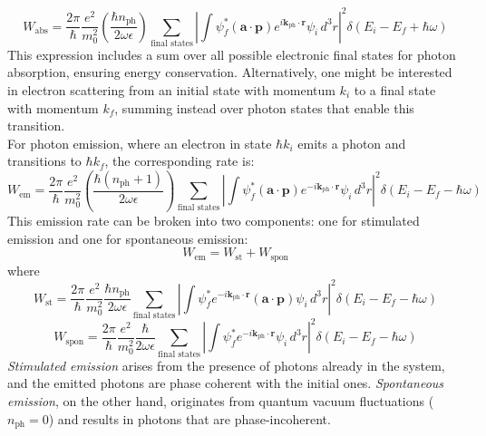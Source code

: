 \begin{equation}
W_{\text{abs}} = \frac{2\pi}{\hbar} \frac{e^2}{m_0^2} \left( \frac{\hbar n_{\text{ph}}}{2 \omega \epsilon} \right) \sum_{\text{final states}} \left| \int \psi_f^* (\mathbf{a} \cdot \mathbf{p}) e^{i \mathbf{k}_{\text{ph}} \cdot \mathbf{r}} \psi_i \, d^3r \right|^2 \delta(E_i - E_f + \hbar \omega)
\end{equation}
This expression includes a sum over all possible electronic final states for photon absorption, ensuring energy conservation. Alternatively, one might be interested in electron scattering from an initial state with momentum \(k_i\) to a final state with momentum \(k_f\), summing instead over photon states that enable this transition.\\
For photon emission, where an electron in state \(\hbar k_i\) emits a photon and transitions to \(\hbar k_f\), the corresponding rate is:
\begin{equation}
W_{\text{em}} = \frac{2\pi}{\hbar} \frac{e^2}{m_0^2} \left( \frac{\hbar(n_{\text{ph}} + 1)}{2 \omega \epsilon} \right) \sum_{\text{final states}} \left| \int \psi_f^* (\mathbf{a} \cdot \mathbf{p}) e^{-i \mathbf{k}_{\text{ph}} \cdot \mathbf{r}} \psi_i \, d^3r \right|^2 \delta(E_i - E_f - \hbar \omega)
\end{equation}
This emission rate can be broken into two components: one for stimulated emission and one for spontaneous emission:
\begin{equation}
W_{\text{em}} = W_{\text{st}} + W_{\text{spon}}
\end{equation}
where
\begin{equation}
W_{\text{st}} = \frac{2\pi}{\hbar} \frac{e^2}{m_0^2} \frac{\hbar n_{\text{ph}}}{2 \omega \epsilon} \sum_{\text{final states}} \left| \int \psi_f^* e^{-i \mathbf{k}_{\text{ph}} \cdot \mathbf{r}} (\mathbf{a} \cdot \mathbf{p}) \psi_i \, d^3r \right|^2 \delta(E_i - E_f - \hbar \omega)
\end{equation}
\begin{equation}
W_{\text{spon}} = \frac{2\pi}{\hbar} \frac{e^2}{m_0^2} \frac{\hbar}{2 \omega \epsilon} \sum_{\text{final states}} \left| \int \psi_f^* e^{-i \mathbf{k}_{\text{ph}} \cdot \mathbf{r}} \psi_i \, d^3r \right|^2 \delta(E_i - E_f - \hbar \omega)
\end{equation}
\textit{Stimulated emission} arises from the presence of photons already in the system, and the emitted photons are phase coherent with the initial ones. \textit{Spontaneous emission}, on the other hand, originates from quantum vacuum fluctuations (\(n_{\text{ph}} = 0\)) and results in photons that are phase-incoherent.\\
